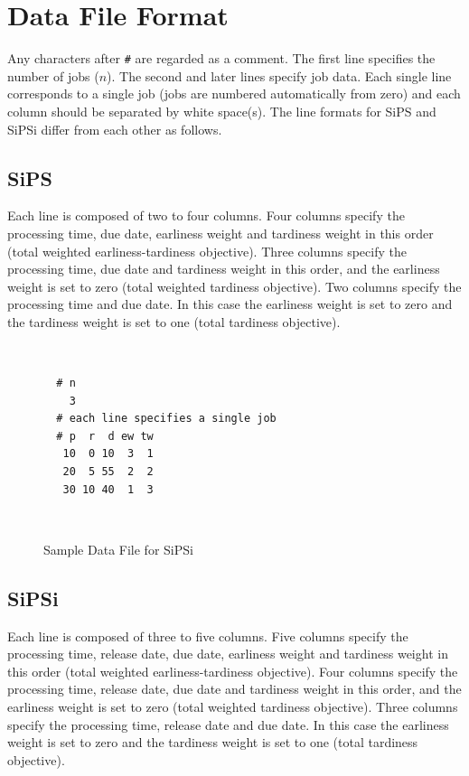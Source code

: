 \documentclass[a4paper]{book}
\newenvironment{fminipage}%
{\begin{Sbox}\begin{minipage}}{\end{minipage}\end{Sbox}\fbox{\TheSbox}}
\begin{document}
\section{Data File Format}
\label{sec:fileformat}

Any characters after \verb+#+ are regarded as a comment.
The first line specifies the number of jobs ($n$).
The second and later lines specify job data.
Each single line corresponds to a single job (jobs are numbered automatically from zero) and each column should be separated by white space(s).
The line formats for SiPS and SiPSi differ from each other as follows.

\subsection{SiPS}

Each line is composed of two to four columns.
Four columns specify the processing time, due date, earliness weight and tardiness weight in this order (total weighted earliness-tardiness objective).
Three columns specify the processing time, due date and tardiness weight in this order, and the earliness weight is set to zero (total weighted tardiness objective).
Two columns specify the processing time and due date.
In this case the earliness weight is set to zero and the tardiness weight is set to one (total tardiness objective).

%
\begin{figure}[tb]
  \centering
  \begin{fminipage}[t]{0.96\textwidth}
    \mbox{}\\[-20pt]
    \begin{verbatim}
  # n
    3
  # each line specifies a single job
  # p  r  d ew tw
   10  0 10  3  1
   20  5 55  2  2
   30 10 40  1  3
    \end{verbatim}
    \mbox{}\\[-35pt]
  \end{fminipage}

  \caption{Sample Data File for SiPSi}
  \label{fig:exampledata}
\end{figure}
%

\subsection{SiPSi}

Each line is composed of three to five columns.
Five columns specify the processing time, release date, due date, earliness weight and tardiness weight in this order (total weighted earliness-tardiness objective).
Four columns specify the processing time, release date, due date and tardiness weight in this order, and the earliness weight is set to zero (total weighted tardiness objective).
Three columns specify the processing time, release date and due date.
In this case the earliness weight is set to zero and the tardiness weight is set to one (total tardiness objective).
\end{document}
